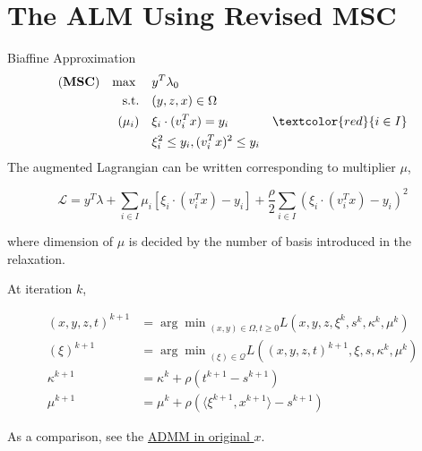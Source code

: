 \documentclass[aspectratio=1610, 9pt]{beamer}
\newcommand{\model}[1]{(\textbf{#1})}
\newcommand{\mx}{\mathbf{\max}\;}
\newcommand{\red}[1]{\textcolor{red}{#1}}
\begin{document}
\section{The ALM Using Revised MSC}
\begin{frame}{Biaffine Approximation}
  \begin{align}
    \model{MSC} \quad \mx \quad & y ^T\lambda_0                                       \\
    \mathrm{s.t.} \quad         & (y,z,x) \in \Omega                                  \\
    ( \mu_i)    \quad           & \xi_i \cdot (v_i^Tx) = y_i           & \red{i\in I} \\
                                & \xi_i^2 \le y_i,  (v_i^Tx)^2 \le y_i
  \end{align}
  The augmented Lagrangian can be written corresponding to multiplier \(\mu\),

  \begin{equation}
    \mathcal L = y^T\lambda + \sum_{i \in I} \mu_i \left [\xi_i \cdot(v_i^Tx) - y_i\right] + \frac{\rho}{2}\sum_{i \in I} (\xi_i \cdot (v_i^Tx) - y_i)^2
  \end{equation}

  where dimension of \(\mu\) is decided by the number of basis introduced in the relaxation.

  At iteration \(k\),

  \begin{align*}
    (x,y,z,t)^{k+1} & = {\arg\min}_{(x,y)\in\Omega, t\ge 0} L\left(x,y,z,\xi^k,s^k,\kappa^k,\mu^k\right)      \\
    (\xi)^{k+1}     & = {\arg\min}_{(\xi)\in\mathscr{Q}} L\left((x,y,z,t)^{k+1},\xi,s, \kappa^k, \mu^k\right) \\
    \kappa^{k+1}    & = \kappa^k + \rho\left(t^{k+1}-s^{k+1}\right)                                           \\
    \mu^{k+1}       & = \mu^k + \rho\left( \langle\xi^{k+1}, x^{k+1}\rangle - s^{k+1}\right)
  \end{align*}

  As a comparison, see the \hyperlink{oldad}{ADMM in original \(x\)}.
\end{frame}
\end{document}
